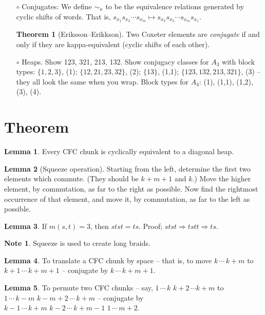 \documentclass{article}
\theoremstyle{definition}
\newtheorem{Lemma}{Lemma}
\newtheorem*{note}{Note}
\theoremstyle{theorem}
\newtheorem{theorem}{Theorem}
\begin{document}
\begin{itemize}
	\item[$\circ$] Conjugates: We define $\sim_\kappa$ to be the equivalence relations generated by cyclic shifts of words. That is, $s_{x_1}s_{x_2} \cdots s_{x_m} \mapsto s_{x_2}s_{x_3} \cdots s_{x_m}s_{x_1}$.
	\begin{theorem}[Eriksson--Erikkson] Two Coxeter elements are \emph{conjugate} if and only if they are kappa-equivalent (cyclic shifts of each other). \end{theorem}
	

	\item[$\circ$] Heaps. Show 123, 321, 213, 132. Show conjugacy classes for $A_3$ with block types: $\{1,2,3\}$, (1); $\{12,21,23,32\}$, (2); $\{13\}$, (1,1); $\{123,132,213,321\}$, (3) -- they all look the same when you wrap. Block types for $A_4$: (1), (1,1), (1,2), (3), (4).
\pagebreak
\end{itemize}

\section{Theorem}
\begin{Lemma} Every CFC chunk is cyclically equivalent to a diagonal heap. \end{Lemma}
\begin{Lemma}[Squeeze operation] Starting from the left, determine the first two elements which commute. (They should be $k+m+1$ and $k$.) Move the higher element, by commutation, as far to the right as possible. Now find the rightmost occurrence of that element, and move it, by commutation, as far to the left as possible. \end{Lemma}
\begin{Lemma} If $m(s,t)=3$, then $stst = ts$. Proof; $stst \Rightarrow tstt \Rightarrow ts$. \end{Lemma}
\begin{note} Squeeze is used to create long braids. \end{note}
\begin{Lemma} To translate a CFC chunk by space -- that is, to move $k \, \cdots \, k+m$ to $k+1 \, \cdots \, k+m+1$ -- conjugate by $k \, \cdots \, k+m+1$. \end{Lemma}
\begin{Lemma} To permute two CFC chunks -- say, $1 \, \cdots \, k \,\, k+2 \, \cdots k+m$ to $1 \, \cdots \, k-m \,\, k-m+2 \, \cdots \, k+m$ -- conjugate by $k-1 \, \cdots \, k+m \,\, k-2 \, \cdots \, k+m-1 \,\, 1 \, \cdots \, m+2$. \end{Lemma}
\end{document}
